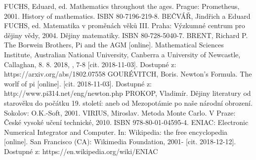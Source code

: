 \documentclass[soc]{gzwroc} %
\begin{document}
\begin{oldthebibliography}{99}
FUCHS, Eduard, ed. Mathematics throughout the ages. Prague: Prometheus, 2001. History of mathematics. ISBN 80-7196-219-8.
BEČVÁŘ, Jindřich a Eduard FUCHS, ed. Matematika v proměnách věků III. Praha: Výzkumné centrum pro dějiny vědy, 2004. Dějiny matematiky. ISBN 80-728-5040-7.
BRENT, Richard P. The Borwein Brothers, Pi and the AGM [online]. Mathematical Sciences Institute, Australian National University, Canberra a University of Newcastle, Callaghan, 8. 8. 2018, , 7-8 [cit. 2018-11-03]. Dostupné z: https://arxiv.org/abs/1802.07558
GOURÉVITCH, Boris. Newton's Formula. The worlf of pi [online]. [cit. 2018-11-03]. Dostupné z: http://www.pi314.net/eng/newton.php
PROKOP, Vladimír. Dějiny literatury od starověku do počátku 19. století: aneb od Mezopotámie po naše národní obrození. Sokolov: O.K.-Soft, 2001.
VIRIUS, Miroslav. Metoda Monte Carlo. V Praze: České vysoké učení technické, 2010. ISBN 978-80-01-04595-4.
ENIAC: Electronic Numerical Integrator and Computer. In: Wikipedia: the free encyclopedia [online]. San Francisco (CA): Wikimedia Foundation, 2001- [cit. 2018-12-12]. Dostupné z: https://en.wikipedia.org/wiki/ENIAC
\end{oldthebibliography}
\newpage
\listoffigures
\listoftables
\newpage
\prilohy
\end{document}
